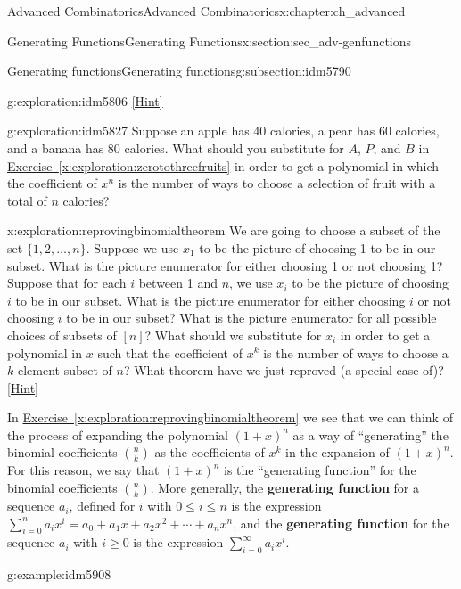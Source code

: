 \documentclass[oneside,10pt,]{book}
\newcommand{\terminology}[1]{\textbf{#1}}
\numberwithin{equation}{chapter}
\begin{document}
\begin{chapterptx}{Advanced Combinatorics}{}{Advanced Combinatorics}{}{}{x:chapter:ch_advanced}
\begin{sectionptx}{Generating Functions}{}{Generating Functions}{}{}{x:section:sec_adv-genfunctions}
\begin{subsectionptx}{Generating functions}{}{Generating functions}{}{}{g:subsection:idm5790}
\begin{exploration}{}{g:exploration:idm5806}
\space\hspace*{0pt}\hfill{\tiny\hyperlink{g:hint:idm5815-back}{[Hint]}}\end{exploration}
\begin{exploration}{}{g:exploration:idm5827}%
Suppose an apple has 40 calories, a pear has 60 calories, and a banana has 80 calories. What should you substitute for \(A\), \(P\), and \(B\) in \hyperref[x:exploration:zerotothreefruits]{Exercise~\ref{x:exploration:zerotothreefruits}} in order to get a polynomial in which the coefficient of \(x^n\) is the number of ways to choose a selection of fruit with a total of \(n\) calories?%
\end{exploration}
\begin{exploration}{}{x:exploration:reprovingbinomialtheorem}%
We are going to choose a subset of the set \(\{1,2,\ldots, n\}\). Suppose we use \(x_1\) to be the picture of choosing 1 to be in our subset. What is the picture enumerator for either choosing 1 or not choosing 1? Suppose that for each \(i\) between 1 and \(n\), we use \(x_i\) to be the picture of choosing \(i\) to be in our subset. What is the picture enumerator for either choosing \(i\) or not choosing \(i\) to be in our subset? What is the picture enumerator for all possible choices of subsets of \([n]\)? What should we substitute for \(x_i\) in order to get a polynomial in \(x\) such that the coefficient of \(x^k\) is the number of ways to choose a \(k\)-element subset of \(n\)? What theorem have we just reproved (a special case of)?%
\space\hspace*{0pt}\hfill{\tiny\hyperlink{g:hint:idm5861-back}{[Hint]}}\end{exploration}
In \hyperref[x:exploration:reprovingbinomialtheorem]{Exercise~\ref{x:exploration:reprovingbinomialtheorem}} we see that we can think of the process of expanding the polynomial \((1+x)^n\) as a way of ``generating'' the binomial coefficients \(\binom{n}{k}\) as the coefficients of \(x^k\) in the expansion of \((1+x)^n\). For this reason, we say that \((1+x)^n\) is the ``generating function'' for the binomial coefficients \(\binom{n}{k}\). More generally, the \terminology{generating function} for a sequence \(a_i\), defined for \(i\) with \(0\le i\le n\) is the expression \(\sum_{i=0}^n a_ix^i = a_0 + a_1x + a_2x^2 + \cdots + a_nx^n\), and the \terminology{generating function} for the sequence \(a_i\) with \(i\ge 0\) is the expression \(\sum_{i=0}^\infty a_ix^i\).%
\begin{example}{}{g:example:idm5908}%

\end{example}
\end{subsectionptx}
\end{sectionptx}
\end{chapterptx}
\end{document}
